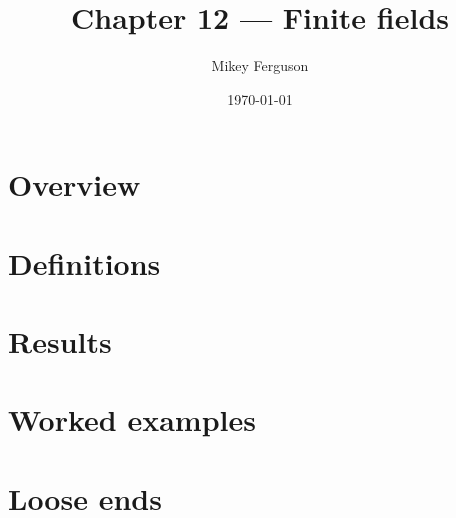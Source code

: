 \documentclass[11pt]{article}
\title{Chapter 12 --- Finite fields}
\author{Mikey Ferguson}
\date{\today}
\begin{document}
\maketitle
\tableofcontents
\bigskip

\section{Overview}

\section{Definitions}

\section{Results}

\section{Worked examples}

\section{Loose ends}
\end{document}
